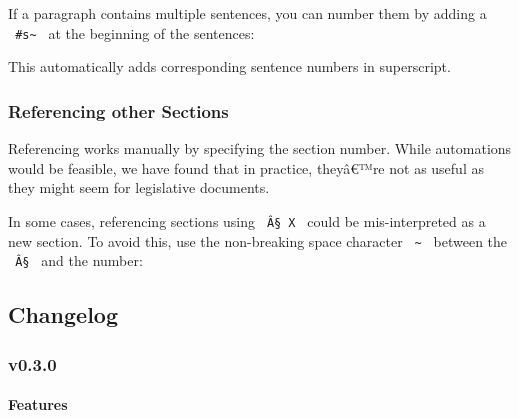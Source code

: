 If a paragraph contains multiple sentences, you can number them by
adding a \texttt{\ \#s\textasciitilde{}\ } at the beginning of the
sentences:

\begin{Shaded}
\begin{Highlighting}[]

\end{Highlighting}
\end{Shaded}

This automatically adds corresponding sentence numbers in superscript.

\subsubsection{Referencing other
Sections}\label{referencing-other-sections}

Referencing works manually by specifying the section number. While
automations would be feasible, we have found that in practice, theyâ€™re
not as useful as they might seem for legislative documents.

In some cases, referencing sections using \texttt{\ Â§\ X\ } could be
mis-interpreted as a new section. To avoid this, use the non-breaking
space character \texttt{\ \textasciitilde{}\ } between the
\texttt{\ Â§\ } and the number:

\begin{Shaded}
\begin{Highlighting}[]

\end{Highlighting}
\end{Shaded}

\subsection{Changelog}\label{changelog}

\subsubsection{v0.3.0}\label{v0.3.0}

\paragraph{Features}\label{features}

